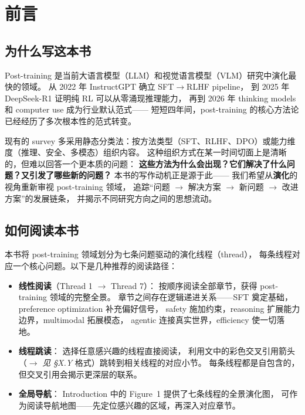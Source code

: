 \section*{前言}

\subsection*{为什么写这本书}

Post-training 是当前大语言模型（LLM）和视觉语言模型（VLM）研究中演化最快的领域。
从 2022 年 InstructGPT 确立 SFT$\rightarrow$RLHF pipeline，
到 2025 年 DeepSeek-R1 证明纯 RL 可以从零涌现推理能力，
再到 2026 年 thinking models 和 computer use 成为行业默认范式——
短短四年间，post-training 的核心方法论已经经历了多次根本性的范式转变。

现有的 survey 多采用静态分类法：按方法类型（SFT、RLHF、DPO）或能力维度（推理、安全、多模态）组织内容。
这种组织方式在某一时间切面上是清晰的，但难以回答一个更本质的问题：
\textbf{这些方法为什么会出现？它们解决了什么问题？又引发了哪些新的问题？}
本书的写作动机正是源于此——
我们希望从\textbf{演化}的视角重新审视 post-training 领域，
追踪``问题 $\rightarrow$ 解决方案 $\rightarrow$ 新问题 $\rightarrow$ 改进方案''的发展链条，
并揭示不同研究方向之间的思想流动。

\subsection*{如何阅读本书}

本书将 post-training 领域划分为七条问题驱动的演化线程（thread），
每条线程对应一个核心问题。以下是几种推荐的阅读路径：

\begin{itemize}[leftmargin=2em]
  \item \textbf{线性阅读}（Thread 1 $\rightarrow$ Thread 7）：
    按顺序阅读全部章节，获得 post-training 领域的完整全景。
    章节之间存在逻辑递进关系——SFT 奠定基础，preference optimization 补充偏好信号，
    safety 施加约束，reasoning 扩展能力边界，multimodal 拓展模态，
    agentic 连接真实世界，efficiency 使一切落地。

  \item \textbf{线程跳读}：
    选择任意感兴趣的线程直接阅读，
    利用文中的彩色交叉引用箭头（{\color{thread2}$\rightarrow$} \textit{见 \S X.Y} 格式）跳转到相关线程的对应小节。
    每条线程都是自包含的，但交叉引用会揭示更深层的联系。

  \item \textbf{全局导航}：
    Introduction 中的 Figure~1 提供了七条线程的全景演化图，
    可作为阅读导航地图——先定位感兴趣的区域，再深入对应章节。
\end{itemize}

